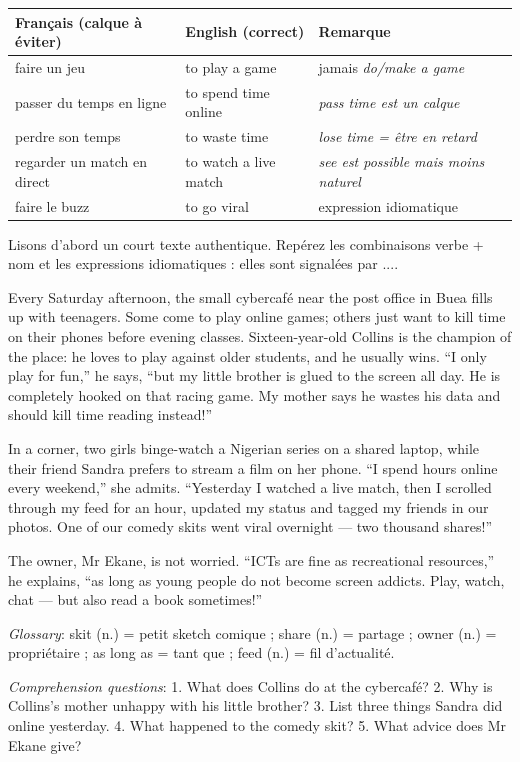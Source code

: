 \documentclass[11pt]{article}
\newcommand{\cle}[1]{{\popxbold\color{popdark}#1}}
\newcounter{popsec}
\newcounter{popsub}
\newcommand{\courssub}[1]{%
  \stepcounter{popsub}%
  \par\vspace{9pt}\noindent{\popxbold\fontsize{11.5}{13}\selectfont\color{popink}{\color{poporange}\thepopsec.\thepopsub}\hspace{6pt}#1}\par\nopagebreak\vspace{4pt}
}
\newcommand{\eng}[1]{\ifmmode\text{\textit{#1}}\else\begingroup\selectlanguage{english}\itshape #1\endgroup\fi}
\begin{document}
\begin{center}
\begin{tabularx}{\linewidth}{|X|X|X|}\hline
\rowcolor{popblueL} Français (calque à éviter) & English (correct) & Remarque \\ \hline
faire un jeu & to \cle{play} a game & jamais \eng{do/make a game} \\ \hline
passer du temps en ligne & to \cle{spend} time online & \eng{pass time} est un calque \\ \hline
perdre son temps & to \cle{waste} time & \eng{lose time} = être en retard \\ \hline
regarder un match en direct & to \cle{watch} a live match & \eng{see} est possible mais moins naturel \\ \hline
faire le buzz & to \cle{go viral} & expression idiomatique \\ \hline
\end{tabularx}
\end{center}

\courssub{Observing collocations in context}

Lisons d'abord un court texte authentique. Repérez les combinaisons verbe + nom et les expressions idiomatiques : elles sont signalées par \cle{...}.

\begin{textebox}
Every Saturday afternoon, the small cybercafé near the post office in Buea fills up with teenagers. Some come to \cle{play online} games; others just want to \cle{kill time} on their phones before evening classes. Sixteen-year-old Collins is the champion of the place: he loves to \cle{play against} older students, and he usually wins. “I only \cle{play for fun},” he says, “but my little brother is \cle{glued to the screen} all day. He is completely \cle{hooked on} that racing game. My mother says he \cle{wastes his data} and should kill time reading instead!”

In a corner, two girls \cle{binge-watch} a Nigerian series on a shared laptop, while their friend Sandra prefers to \cle{stream a film} on her phone. “I \cle{spend hours online} every weekend,” she admits. “Yesterday I watched a live match, then I \cle{scrolled through my feed} for an hour, \cle{updated my status} and \cle{tagged my friends} in our photos. One of our comedy skits \cle{went viral} overnight — two thousand shares!”

The owner, Mr Ekane, is not worried. “ICTs are fine as recreational resources,” he explains, “as long as young people do not become \cle{screen addicts}. Play, watch, chat — but also read a book sometimes!”

\emph{Glossary}: skit (n.) = petit sketch comique ; share (n.) = partage ; owner (n.) = propriétaire ; as long as = tant que ; feed (n.) = fil d'actualité.

\emph{Comprehension questions}: 1. What does Collins do at the cybercafé? 2. Why is Collins's mother unhappy with his little brother? 3. List three things Sandra did online yesterday. 4. What happened to the comedy skit? 5. What advice does Mr Ekane give?
\end{textebox}
\end{document}
